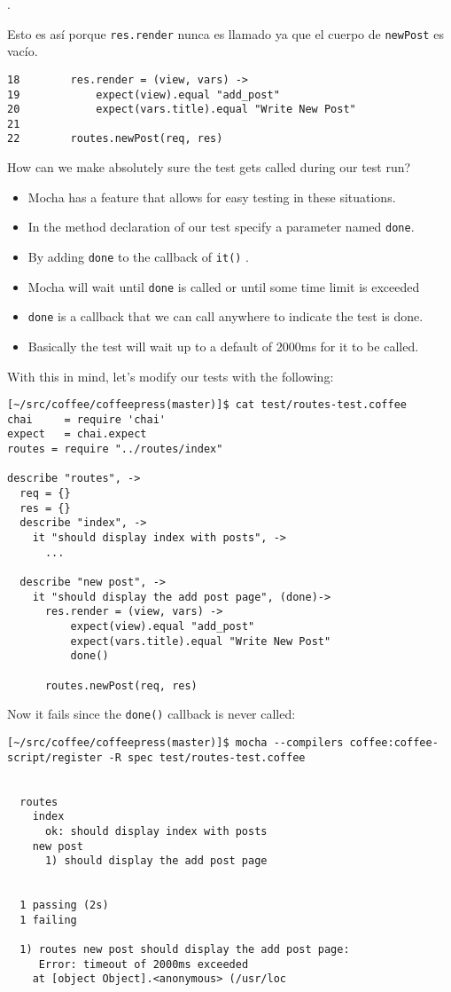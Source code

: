 
. 

Esto es así porque \verb|res.render| nunca es llamado ya que 
el cuerpo de \verb|newPost| es vacío.

\begin{verbatim}
18        res.render = (view, vars) ->
19            expect(view).equal "add_post"
20            expect(vars.title).equal "Write New Post"
21      
22        routes.newPost(req, res)
\end{verbatim}

How can we make absolutely sure the test gets called during our test run? 
\begin{itemize}
\item
Mocha has a feature that allows for easy testing in these situations. 
\item
In
the method declaration of our test specify a parameter named \verb|done|. 
\item
By adding \verb|done| to the callback of \verb|it()| 
.
\item
Mocha will wait until \verb|done| is called or until some time limit is exceeded
\item
\verb|done|
is a callback that we can call anywhere to indicate the test is
done. 
\item
Basically the test will wait up to a default of 2000ms for it to
be called. 
\end{itemize}
With this in mind, let’s modify our tests with the following:
\begin{verbatim}
[~/src/coffee/coffeepress(master)]$ cat test/routes-test.coffee 
chai     = require 'chai'
expect   = chai.expect
routes = require "../routes/index"

describe "routes", ->
  req = {}
  res = {}
  describe "index", ->
    it "should display index with posts", ->
      ...

  describe "new post", ->
    it "should display the add post page", (done)->
      res.render = (view, vars) ->
          expect(view).equal "add_post"
          expect(vars.title).equal "Write New Post"
          done()
    
      routes.newPost(req, res)
\end{verbatim}
Now it fails since the \verb|done()| callback is never called:
\begin{verbatim}
[~/src/coffee/coffeepress(master)]$ mocha --compilers coffee:coffee-script/register -R spec test/routes-test.coffee 


  routes
    index
      ok: should display index with posts 
    new post
      1) should display the add post page


  1 passing (2s)
  1 failing

  1) routes new post should display the add post page:
     Error: timeout of 2000ms exceeded
    at [object Object].<anonymous> (/usr/loc
\end{verbatim}

